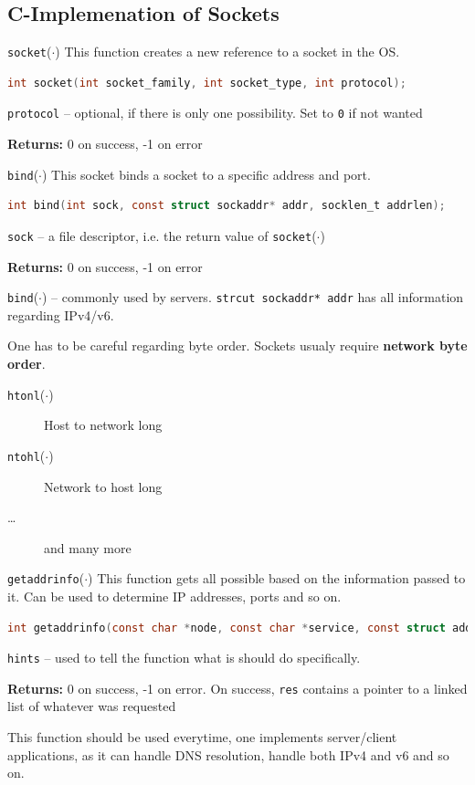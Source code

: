 \documentclass[english]{panikzettel}
\newcommand{\fkt}[1]{\texttt{#1}(\(\cdot\))}
\begin{document}
	\subsection{C-Implemenation of Sockets}

	\begin{defi}{\fkt{socket}}
		This function creates a new reference to a socket in the OS.
		\begin{lstlisting}[language=C]
			int socket(int socket_family, int socket_type, int protocol);
		\end{lstlisting}
		\tcblower
		\texttt{protocol} – optional, if there is only one possibility. 
		Set to \texttt{0} if not wanted

		\textbf{Returns:} 0 on success, -1 on error
	\end{defi}

	\begin{defi}{\fkt{bind}}
		This socket binds a socket to a specific address and port.
		\begin{lstlisting}[language=C]
			int bind(int sock, const struct sockaddr* addr, socklen_t addrlen);
		\end{lstlisting}
		\tcblower
		\texttt{sock} – a file descriptor, i.e. the return value of \fkt{socket}

		\textbf{Returns:} 0 on success, -1 on error
	\end{defi}
	\fkt{bind} – commonly used by servers.
	\texttt{strcut sockaddr* addr} has all information regarding IPv4/v6.

	One has to be careful regarding byte order. 
	Sockets usualy require \textbf{network byte order}. 
	
	\begin{description}
		\item[\fkt{htonl}] Host to network long
		\item[\fkt{ntohl}] Network to host long
		\item[\dots] and many more
	\end{description}

	\begin{defi}{\fkt{getaddrinfo}}
		This function gets all possible based on the information passed to it.
		Can be used to determine IP addresses, ports and so on.
		\begin{lstlisting}[language=C]
			int getaddrinfo(const char *node, const char *service, const struct addrinfo *hints, struct addrinfo **res);	
		\end{lstlisting}
		\tcblower
		\texttt{hints} – used to tell the function what is should do specifically.

		\textbf{Returns:} 0 on success, -1 on error. 
		On success, \texttt{res} contains a pointer to a linked list of whatever was requested
	\end{defi}
	This function should be used everytime, one implements server/client applications, as it can handle DNS resolution, handle both IPv4 and v6 and so on.
\end{document}
